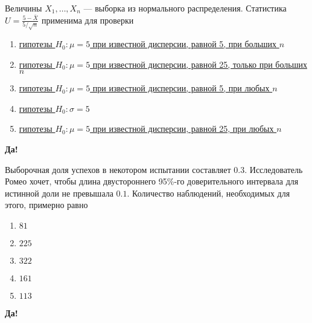 \documentclass[t]{beamer}
\begin{document}
 \begin{frame} \label{17-Yes} 
\begin{block}{17} 

  Величины $X_1,\ldots,X_n$ — выборка из нормального распределения.  Статистика $U=\frac{5-\bar{X}}{5/\sqrt{n}}$ применима для проверки
  


 \end{block} 
\begin{enumerate} 
\item[] \hyperlink{17-No}{\beamergotobutton{} гипотезы $H_0: \mu = 5$ при известной дисперсии, равной 5, при больших $n$}
\item[] \hyperlink{17-No}{\beamergotobutton{} гипотезы $H_0: \mu = 5$ при известной дисперсии, равной 25, только при больших $n$}
\item[] \hyperlink{17-No}{\beamergotobutton{} гипотезы $H_0: \mu = 5$ при известной дисперсии, равной 5, при любых $n$}
\item[] \hyperlink{17-No}{\beamergotobutton{} гипотезы $H_0: \sigma = 5$}
\item[] \hyperlink{17-Yes}{\beamergotobutton{} гипотезы $H_0: \mu = 5$ при известной дисперсии, равной 25, при любых $n$}
\end{enumerate} 

 \textbf{Да!} 
 \hyperlink{18}{}\end{frame} 


 \begin{frame} \label{18-Yes} 
\begin{block}{18} 

Выборочная доля успехов в некотором испытании составляет $0.3$. Исследователь Ромео хочет, чтобы длина двустороннего 95\%-го доверительного интервала для истинной доли не превышала $0.1$. Количество наблюдений, необходимых для этого, примерно равно
  


 \end{block} 
\begin{enumerate} 
\item[] \hyperlink{18-No}{\beamergotobutton{} $81$}
\item[] \hyperlink{18-No}{\beamergotobutton{} $225$}
\item[] \hyperlink{18-Yes}{\beamergotobutton{} $322$}
\item[] \hyperlink{18-No}{\beamergotobutton{} $161$}
\item[] \hyperlink{18-No}{\beamergotobutton{} $113$}
\end{enumerate} 

 \textbf{Да!} 
 \hyperlink{19}{}\end{frame} 
\end{document}
